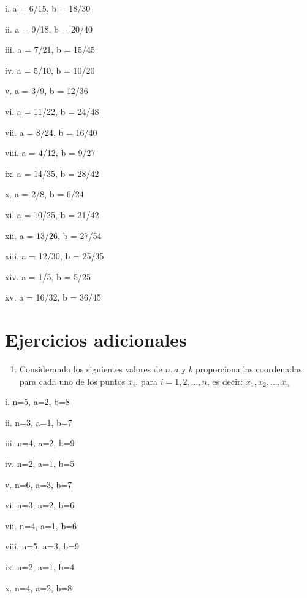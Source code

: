 \documentclass[]{book}
\providecommand{\tightlist}{%
  \setlength{\itemsep}{0pt}\setlength{\parskip}{0pt}}
\begin{document}
\begin{multicols}{2}
   
    i. a = 6/15, b = 18/30
   
   ii. a = 9/18, b = 20/40
   
   iii. a = 7/21, b = 15/45
   
   iv. a = 5/10, b = 10/20
   
   v. a = 3/9, b = 12/36
   
   vi. a = 11/22, b = 24/48
   
   vii. a = 8/24, b = 16/40
   
   viii. a = 4/12, b = 9/27
   
   ix. a = 14/35, b = 28/42
   
   x. a = 2/8, b = 6/24
   
   xi. a = 10/25, b = 21/42
   
   xii. a = 13/26, b = 27/54
   
   xiii. a = 12/30, b = 25/35
   
   xiv. a = 1/5, b = 5/25
   
   xv. a = 16/32, b = 36/45
\end{multicols}

\section{Ejercicios adicionales}\label{ejercicios-adicionales}

\begin{enumerate}
\def\labelenumi{\arabic{enumi}.}
\tightlist
\item
  Considerando los siguientes valores de \(n,a\) y \(b\) proporciona las
  coordenadas para cada uno de los puntos \(x_i\), para
  \(i=1,2,\ldots,n\), es decir: \(x_1,x_2,\ldots,x_n\)
\end{enumerate}

\begin{multicols}{2}
   
    i. n=5, a=2, b=8
   
    ii. n=3, a=1, b=7
   
    iii. n=4, a=2, b=9
   
    iv. n=2, a=1, b=5
   
    v. n=6, a=3, b=7
   
    vi. n=3, a=2, b=6
   
    vii. n=4, a=1, b=6
   
    viii. n=5, a=3, b=9
   
    ix. n=2, a=1, b=4
   
    x. n=4, a=2, b=8
\end{multicols}
\end{document}
